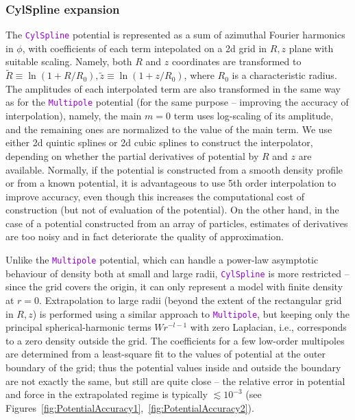 \documentclass[12pt]{article}
\newcommand{\ttt}[1]{\textcolor{darkviolet}{\texttt{#1}}}
\begin{document}
\subsubsection{CylSpline expansion}  \label{sec:PotentialCylSplineDetails}

The \ttt{CylSpline} potential is represented as a sum of azimuthal Fourier harmonics in $\phi$, with coefficients of each term intepolated on a 2d grid in $R,z$ plane with suitable scaling.
Namely, both $R$ and $z$ coordinates are transformed to $\tilde R \equiv \ln(1+R/R_0), \tilde z \equiv \ln(1+z/R_0)$, where $R_0$ is a characteristic radius. The amplitudes of each interpolated term are also transformed in the same way as for the \ttt{Multipole} potential (for the same purpose -- improving the accuracy of interpolation), namely, the main $m=0$ term uses log-scaling of its amplitude, and the remaining ones are normalized to the value of the main term. We use either 2d quintic splines or 2d cubic splines to construct the interpolator, depending on whether the partial derivatives of potential by $R$ and $z$ are available. Normally, if the potential is constructed from a smooth density profile or from a known potential, it is advantageous to use 5th order interpolation to improve accuracy, even though this increases the computational cost of construction (but not of evaluation of the potential). On the other hand, in the case of a potential constructed from an array of particles, estimates of derivatives are too noisy and in fact deteriorate the quality of approximation.

Unlike the \ttt{Multipole} potential, which can handle a power-law asymptotic behaviour of density both at small and large radii, \ttt{CylSpline} is more restricted -- since the grid covers the origin, it can only represent a model with finite density at $r=0$. Extrapolation to large radii (beyond the extent of the rectangular grid in $R,z$) is performed using a similar approach to \ttt{Multipole}, but keeping only the principal spherical-harmonic terms $W r^{-l-1}$ with zero Laplacian, i.e., corresponds to a zero density outside the grid. The coefficients for a few low-order multipoles are determined from a least-square fit to the values of potential at the outer boundary of the grid; thus the potential values inside and outside the boundary are not exactly the same, but still are quite close -- the relative error in potential and force in the extrapolated regime is typically $\lesssim 10^{-3}$ (see Figures~\ref{fig:PotentialAccuracy1},~\ref{fig:PotentialAccuracy2}).
\end{document}
